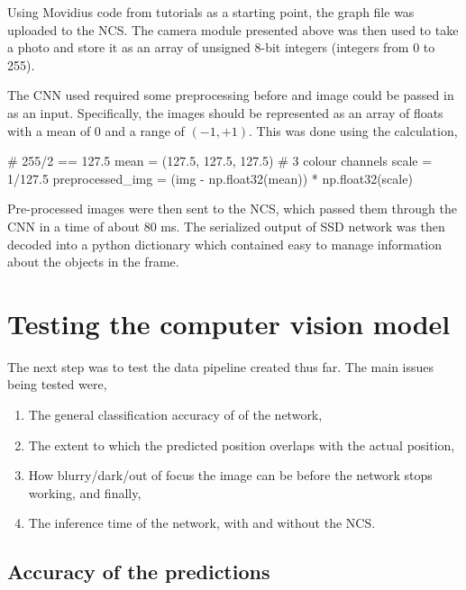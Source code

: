 Using Movidius code from tutorials as a starting point, the graph file was uploaded to the NCS. The camera module presented above was then used to take a photo and store it as an array of unsigned 8-bit integers (integers from 0 to 255).

The CNN used required some preprocessing before and image could be passed in as an input. Specifically, the images should be represented as an array of floats with a mean of 0 and a range of $(-1, +1)$. This was done using the calculation,\\

\begin{python}
# 255/2 == 127.5
mean = (127.5, 127.5, 127.5)  # 3 colour channels
scale = 1/127.5
preprocessed_img = (img - np.float32(mean)) * np.float32(scale)
\end{python}

Pre-processed images were then sent to the NCS, which passed them through the CNN in a time of about 80 ms. The serialized output of SSD network was then decoded into a python dictionary which contained easy to manage information about the objects in the frame.

\section{Testing the computer vision model}
The next step was to test the data pipeline created thus far. The main issues being tested were,

\begin{enumerate}
\item The general classification accuracy of of the network,
\item The extent to which the predicted position overlaps with the actual position,
\item How blurry/dark/out of focus the image can be before the network stops working, and finally,
\item The inference time of the network, with and without the NCS.
\end{enumerate}








\subsection{Accuracy of the predictions}


